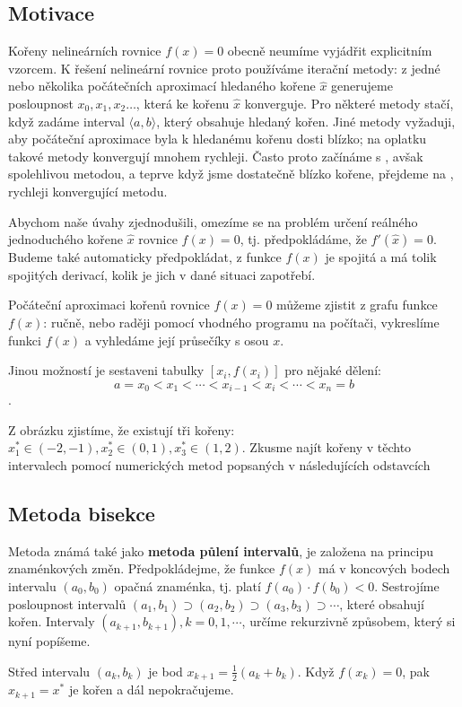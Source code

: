     \subsection{Motivace}
      Kořeny nelineárních rovnice $f(x)=0$ obecně neumíme vyjádřit explicitním vzorcem. K řešení
      nelineární rovnice proto používáme iterační metody: z jedné nebo několika počátečních
      aproximací hledaného kořene $\hat{x}$ generujeme posloupnost $x_0,x_1,x_2…$, která ke kořenu
      $\hat{x}$ konverguje. Pro některé metody stačí, když zadáme interval $\langle a,b\rangle$,
      který obsahuje hledaný kořen. Jiné metody vyžaduji, aby počáteční aproximace byla k hledanému
      kořenu dosti blízko; na oplatku takové metody konvergují mnohem rychleji. Často proto začínáme
      s , avšak spolehlivou metodou, a teprve když jsme dostatečně blízko kořene, 
      přejdeme na , rychleji konvergující metodu.
  
      Abychom naše úvahy zjednodušili, omezíme se na problém určení re\-ál\-né\-ho
      je\-dno\-du\-ché\-ho kořene $\hat{x}$ rovnice $f(x)=0$, tj. předpokládáme, že $f'(\hat{x})=0$.
      Budeme také automaticky předpokládat, z funkce $f(x)$ je spojitá a má tolik spojitých 
      derivací, kolik je jich v dané situaci zapotřebí.
  
      Počáteční aproximaci kořenů rovnice $f(x)=0$ můžeme zjistit z grafu funkce $f(x)$: ručně, nebo
      raději pomocí vhodného programu na počítači, vykreslíme funkci $f(x)$ a vyhledáme její
      průsečíky s osou $x$.
  
      Jinou možností je sestaveni tabulky $[x_i,f(x_i)]$ pro nějaké dělení:
      $$a=x_0<x_1<\cdots<x_{i-1}<x_i<\cdots<x_n=b$$.

      
  
      Z obrázku zjistíme, že existují tři kořeny: $x_1^*\in(-2,-1),x_2^*\in(0,1),x_3^*\in(1,2)$.
      Zkusme najít kořeny v těchto intervalech pomocí numerických metod popsaných v následujících
      odstavcích
  
    \subsection{Metoda bisekce}
      Metoda známá také jako \textbf{metoda půlení intervalů}, je založena na principu
      zna\-mén\-ko\-vých změn. Předpokládejme, že funkce $f(x)$ má v koncových bodech intervalu
      $(a_0,b_0)$ opačná znaménka, tj. platí $f(a_0 )\cdot f(b_0 )<0$. Sestrojíme posloupnost
      intervalů $(a_1,b_1)\supset(a_2,b_2)\supset(a_3,b_3)\supset\cdots$, které obsahují kořen.
      Intervaly $(a_{k+1},b_{k+1}), k=0,1,\cdots$, určíme rekurzivně způsobem, který si nyní
      popíšeme.
  
      Střed intervalu $(a_k,b_k)$ je bod $x_{k+1}=\frac{1}{2}(a_k+b_k)$. Když $f(x_k)=0$, pak
      $x_{k+1}=x^*$ je kořen a dál nepokračujeme.

